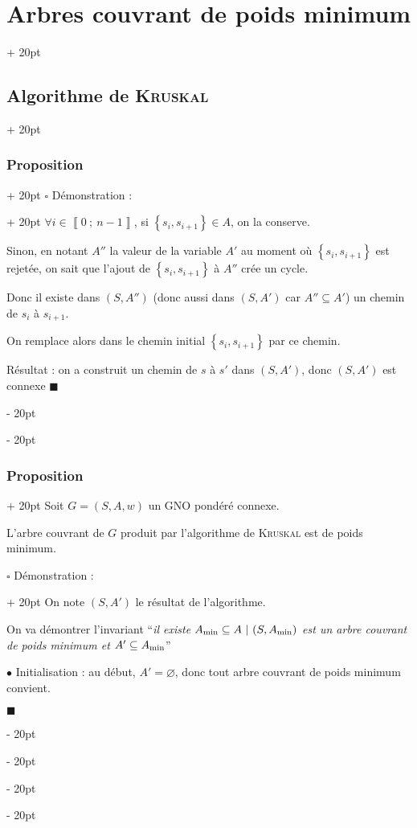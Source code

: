 \documentclass[a4paper, 12pt, twoside]{article}
\newcommand{\nset}[2]{\left\llbracket #1\ ;\ #2 \right\rrbracket}
\newcommand{\set}[1]{\left\{ #1 \right\}}
\newcommand{\ind}[1][20pt]{\advance\leftskip + #1}
\newcommand{\deind}[1][20pt]{\advance\leftskip - #1}
\newenvironment{indt}[2][20pt]{#2 \par \ind[#1]}{\par \deind} %
\newenvironment{proof}[1][{Démonstration :}]{\begin{indt}{$\square$ #1}}{$\blacksquare$ \end{indt}}
\begin{document}
\begin{indt}{\section{Arbres couvrant de poids minimum}}
\begin{indt}{\subsection{Algorithme de \textsc{Kruskal}}}
\begin{indt}{\subsubsection{Proposition}}
\begin{proof}
                    $\forall i \in \nset 0 {n - 1}$, si $\set{s_i, s_{i + 1}} \in A$, on la conserve.

                    Sinon, en notant $A''$ la valeur de la variable $A'$ au moment où $\set{s_i, s_{i + 1}}$ est rejetée, on sait que l'ajout de $\set{s_i, s_{i + 1}}$ à $A''$ crée un cycle.

                    Donc il existe dans $(S, A'')$ (donc aussi dans $(S, A')$ car $A'' \subseteq A'$) un chemin de $s_i$ à $s_{i + 1}$.

                    On remplace alors dans le chemin initial $\set{s_i, s_{i + 1}}$ par ce chemin.

                    \vspace{6pt}
                    
                    Résultat : on a construit un chemin de $s$ à $s'$ dans $(S, A')$, donc $(S, A')$ est connexe
                \end{proof}
            \end{indt}

            \vspace{12pt}
            
            \begin{indt}{\subsubsection{Proposition}}
                Soit $G = (S, A, w)$ un GNO pondéré connexe.

                \begin{pseudocode}
                    L'arbre couvrant de $G$ produit par l'algorithme de \textsc{Kruskal} est de poids minimum.
                \end{pseudocode}

                \vspace{12pt}
                
                \begin{proof}
                    On note $(S, A')$ le résultat de l'algorithme.

                    On va démontrer l'invariant ``\textit{il existe $A_{\rm min} \subseteq A\ |\ (S, A_{\rm min})$ est un arbre couvrant de poids minimum et $A' \subseteq A_{\rm min}$}''

                    \vspace{6pt}
                    
                    $\bullet$ Initialisation : au début, $A' = \varnothing$, donc tout arbre couvrant de poids minimum convient.


\end{proof}
\end{indt}
\end{indt}
\end{indt}
\end{document}
